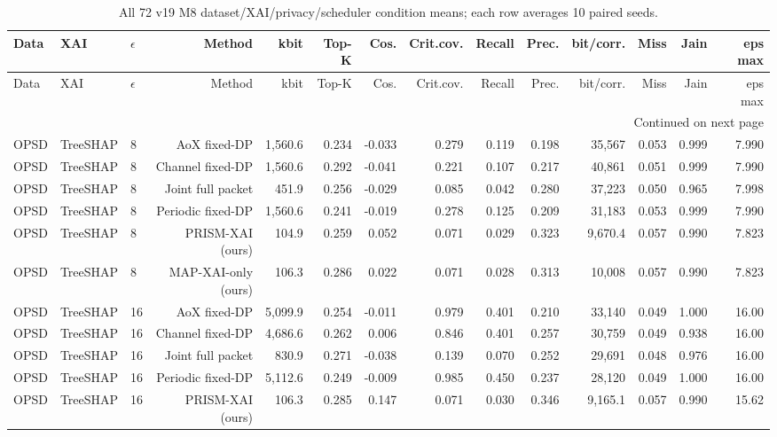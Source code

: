 

\setlength{\tabcolsep}{2pt}
\renewcommand{\arraystretch}{1.08}
\begin{longtable}{lllrrrrrrrrrrr}
\caption{All 72 v19 M8 dataset/XAI/privacy/scheduler condition means; each row averages 10 paired seeds.}\label{tab:all72}\\
\toprule
Data & XAI & $\epsilon$ & Method & kbit & Top-K & Cos. & Crit.cov. & Recall & Prec. & bit/corr. & Miss & Jain & eps max \\
\midrule
\endfirsthead
\toprule
Data & XAI & $\epsilon$ & Method & kbit & Top-K & Cos. & Crit.cov. & Recall & Prec. & bit/corr. & Miss & Jain & eps max \\
\midrule
\endhead
\midrule
\multicolumn{14}{r}{Continued on next page} \\
\endfoot
\bottomrule
\endlastfoot
OPSD & TreeSHAP & 8 & AoX fixed-DP & 1,560.6 & 0.234 & -0.033 & 0.279 & 0.119 & 0.198 & 35,567 & 0.053 & 0.999 & 7.990 \\
OPSD & TreeSHAP & 8 & Channel fixed-DP & 1,560.6 & 0.292 & -0.041 & 0.221 & 0.107 & 0.217 & 40,861 & 0.051 & 0.999 & 7.990 \\
OPSD & TreeSHAP & 8 & Joint full packet & 451.9 & 0.256 & -0.029 & 0.085 & 0.042 & 0.280 & 37,223 & 0.050 & 0.965 & 7.998 \\
OPSD & TreeSHAP & 8 & Periodic fixed-DP & 1,560.6 & 0.241 & -0.019 & 0.278 & 0.125 & 0.209 & 31,183 & 0.053 & 0.999 & 7.990 \\
OPSD & TreeSHAP & 8 & PRISM-XAI (ours) & 104.9 & 0.259 & 0.052 & 0.071 & 0.029 & 0.323 & 9,670.4 & 0.057 & 0.990 & 7.823 \\
OPSD & TreeSHAP & 8 & MAP-XAI-only (ours) & 106.3 & 0.286 & 0.022 & 0.071 & 0.028 & 0.313 & 10,008 & 0.057 & 0.990 & 7.823 \\
OPSD & TreeSHAP & 16 & AoX fixed-DP & 5,099.9 & 0.254 & -0.011 & 0.979 & 0.401 & 0.210 & 33,140 & 0.049 & 1.000 & 16.00 \\
OPSD & TreeSHAP & 16 & Channel fixed-DP & 4,686.6 & 0.262 & 0.006 & 0.846 & 0.401 & 0.257 & 30,759 & 0.049 & 0.938 & 16.00 \\
OPSD & TreeSHAP & 16 & Joint full packet & 830.9 & 0.271 & -0.038 & 0.139 & 0.070 & 0.252 & 29,691 & 0.048 & 0.976 & 16.00 \\
OPSD & TreeSHAP & 16 & Periodic fixed-DP & 5,112.6 & 0.249 & -0.009 & 0.985 & 0.450 & 0.237 & 28,120 & 0.049 & 1.000 & 16.00 \\
OPSD & TreeSHAP & 16 & PRISM-XAI (ours) & 106.3 & 0.285 & 0.147 & 0.071 & 0.030 & 0.346 & 9,165.1 & 0.057 & 0.990 & 15.62 \\

\end{longtable}

